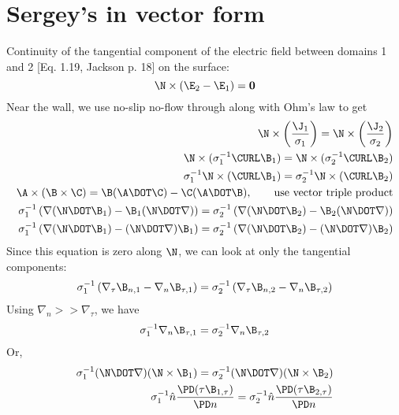 \documentclass[11pt]{article}
\begin{document}
\section{Sergey's in vector form}
Continuity of the tangential component of the electric field between domains 1 and 2 [Eq. 1.19, Jackson p. 18] on the surface:
\begin{equation}
  \N \times (\E_2 - \E_1) = \mathbf{0}
\end{equation}
Near the wall, we use no-slip no-flow through along with Ohm's law to get
\begin{equation}\begin{aligned}
\N \times \left( \frac{\J_1}{\sigma_1} \right) = \N \times \left( \frac{\J_2}{\sigma_2} \right) \\
\N \times (\sigma_1^{-1} \CURL \B_1 ) = \N \times (\sigma_2^{-1} \CURL \B_2 ) \\
\sigma_1^{-1} \N \times (\CURL \B_1 ) = \sigma_2^{-1} \N \times (\CURL \B_2 ) \\
\A \times (\B \times \C) = \B (\A \DOT \C) - \C (\A \DOT \B), \qquad \text{use vector triple product} \\
\sigma_1^{-1} \left( \nabla (\N \DOT \B_1) - \B_1 (\N \DOT \nabla) \right) =
\sigma_2^{-1} \left( \nabla (\N \DOT \B_2) - \B_2 (\N \DOT \nabla) \right) \\
\sigma_1^{-1} \left( \nabla (\N \DOT \B_1) - (\N \DOT \nabla) \B_1 \right) =
\sigma_2^{-1} \left( \nabla (\N \DOT \B_2) - (\N \DOT \nabla) \B_2 \right)
\end{aligned}\end{equation}
Since this equation is zero along $\N$, we can look at only the tangential components:
\begin{equation}\begin{aligned}
\sigma_1^{-1} \left( \nabla_{\tau} \B_{n,1} - \nabla_n \B_{\tau,1} \right) =
\sigma_2^{-1} \left( \nabla_{\tau} \B_{n,2} - \nabla_n \B_{\tau,2} \right)
\end{aligned}\end{equation}
Using $\nabla_n >> \nabla_{\tau}$, we have
\begin{equation}\begin{aligned}
\sigma_1^{-1} \nabla_n \B_{\tau,1} =
\sigma_2^{-1} \nabla_n \B_{\tau,2}
\end{aligned}\end{equation}
Or,
\begin{equation}\begin{aligned}
\sigma_1^{-1} (\N \DOT \nabla) (\N \times \B_1) =
\sigma_2^{-1} (\N \DOT \nabla) (\N \times \B_2) \\
\sigma_1^{-1} \hat{n} \frac{\PD (\tau \B_{1,\tau})}{\PD n} =
\sigma_2^{-1} \hat{n} \frac{\PD (\tau \B_{2,\tau})}{\PD n}
\end{aligned}\end{equation}
\end{document}
